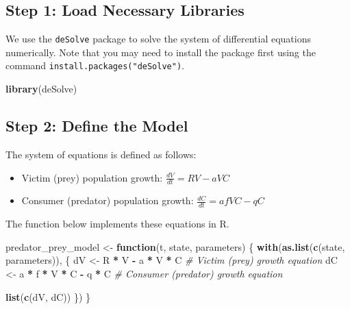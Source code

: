 \documentclass[
  a4paper]{book}
\newenvironment{Shaded}{\begin{snugshade}}{\end{snugshade}}
\newcommand{\CommentTok}[1]{\textcolor[rgb]{0.56,0.35,0.01}{\textit{#1}}}
\newcommand{\ControlFlowTok}[1]{\textcolor[rgb]{0.13,0.29,0.53}{\textbf{#1}}}
\newcommand{\FunctionTok}[1]{\textcolor[rgb]{0.13,0.29,0.53}{\textbf{#1}}}
\newcommand{\NormalTok}[1]{#1}
\newcommand{\OtherTok}[1]{\textcolor[rgb]{0.56,0.35,0.01}{#1}}
\newcommand{\SpecialCharTok}[1]{\textcolor[rgb]{0.81,0.36,0.00}{\textbf{#1}}}
\providecommand{\tightlist}{%
  \setlength{\itemsep}{0pt}\setlength{\parskip}{0pt}}
\begin{document}
\subsection{Step 1: Load Necessary Libraries}\label{step-1-load-necessary-libraries}

We use the \texttt{deSolve} package to solve the system of differential equations numerically. Note that you may need to install the package first using the command \texttt{install.packages("deSolve")}.

\begin{Shaded}
\begin{Highlighting}[]
\FunctionTok{library}\NormalTok{(deSolve)}
\end{Highlighting}
\end{Shaded}

\subsection{Step 2: Define the Model}\label{step-2-define-the-model}

The system of equations is defined as follows:

\begin{itemize}
\tightlist
\item
  Victim (prey) population growth: \(\frac{dV}{dt} = RV - aVC\)
\item
  Consumer (predator) population growth: \(\frac{dC}{dt} = afVC - qC\)
\end{itemize}

The function below implements these equations in R.

\begin{Shaded}
\begin{Highlighting}[]
\NormalTok{predator\_prey\_model }\OtherTok{\textless{}{-}} \ControlFlowTok{function}\NormalTok{(t, state, parameters) \{}
  \FunctionTok{with}\NormalTok{(}\FunctionTok{as.list}\NormalTok{(}\FunctionTok{c}\NormalTok{(state, parameters)), \{}
\NormalTok{    dV }\OtherTok{\textless{}{-}}\NormalTok{ R }\SpecialCharTok{*}\NormalTok{ V }\SpecialCharTok{{-}}\NormalTok{ a }\SpecialCharTok{*}\NormalTok{ V }\SpecialCharTok{*}\NormalTok{ C  }\CommentTok{\# Victim (prey) growth equation}
\NormalTok{    dC }\OtherTok{\textless{}{-}}\NormalTok{ a }\SpecialCharTok{*}\NormalTok{ f }\SpecialCharTok{*}\NormalTok{ V }\SpecialCharTok{*}\NormalTok{ C }\SpecialCharTok{{-}}\NormalTok{ q }\SpecialCharTok{*}\NormalTok{ C  }\CommentTok{\# Consumer (predator) growth equation}
    
    \FunctionTok{list}\NormalTok{(}\FunctionTok{c}\NormalTok{(dV, dC))}
\NormalTok{  \})}
\NormalTok{\}}
\end{Highlighting}
\end{Shaded}
\end{document}
